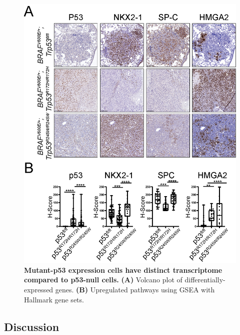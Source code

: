 \begin{figure}
\hypertarget{fig:14}{%
\centering
\includegraphics{images/p53_4.png}
\caption{\textbf{Mutant-p53 expression cells have distinct transcriptome compared to p53-null cells.} \textbf{(A)} Volcano plot of differentially-expressed genes. \textbf{(B)} Upregulated pathways using GSEA with Hallmark gene sets.}\label{fig:14}
}
\end{figure}

\hypertarget{discussion-1}{%
\subsection{Discussion}\label{discussion-1}}

